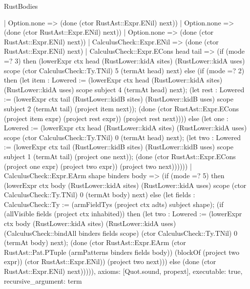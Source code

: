 \begin{lexlean}{RustBodies}
\begin{semanticmodule}
{          | Option.none => (done (ctor RustAst::Expr.ENil) next))
        | Option.none => (done (ctor RustAst::Expr.ENil) next))
      | Option.none => (done (ctor RustAst::Expr.ENil) next))
    | CalculusCheck::Expr.ENil => (done (ctor RustAst::Expr.ENil) next)
    | CalculusCheck::Expr.ECons head tail => (if (mode =? 3) then (lowerExpr ctx head (RustLower::kidA sites) (RustLower::kidA uses) scope (ctor CalculusCheck::Ty.TNil) 5 (termAt head) next) else (if (mode =? 2) then (let item : Lowered := (lowerExpr ctx head (RustLower::kidA sites) (RustLower::kidA uses) scope subject 4 (termAt head) next); (let rest : Lowered := (lowerExpr ctx tail (RustLower::kidB sites) (RustLower::kidB uses) scope subject 2 (termAt tail) (project item next)); (done (ctor RustAst::Expr.ECons (project item expr) (project rest expr)) (project rest next)))) else (let one : Lowered := (lowerExpr ctx head (RustLower::kidA sites) (RustLower::kidA uses) scope (ctor CalculusCheck::Ty.TNil) 0 (termAt head) next); (let two : Lowered := (lowerExpr ctx tail (RustLower::kidB sites) (RustLower::kidB uses) scope subject 1 (termAt tail) (project one next)); (done (ctor RustAst::Expr.ECons (project one expr) (project two expr)) (project two next))))))
    | CalculusCheck::Expr.EArm shape binders body => (if (mode =? 5) then (lowerExpr ctx body (RustLower::kidA sites) (RustLower::kidA uses) scope (ctor CalculusCheck::Ty.TNil) 0 (termAt body) next) else (let fields : CalculusCheck::Ty := (armFieldTys (project ctx adts) subject shape); (if (allVisible fields (project ctx inhabited)) then (let two : Lowered := (lowerExpr ctx body (RustLower::kidA sites) (RustLower::kidA uses) (CalculusCheck::bindAll binders fields scope) (ctor CalculusCheck::Ty.TNil) 0 (termAt body) next); (done (ctor RustAst::Expr.EArm (ctor RustAst::Pat.PTuple (armPatterns binders fields body)) (blockOf (project two expr)) (ctor RustAst::Expr.ENil)) (project two next))) else (done (ctor RustAst::Expr.ENil) next))))),
  axioms: [Quot.sound, propext],
  executable: true,
  recursive_argument: term
}


\end{semanticmodule}
\end{lexlean}
